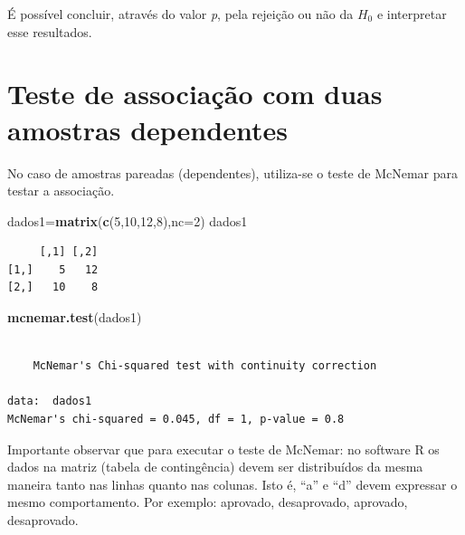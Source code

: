 \documentclass[12pt,brazil,oneside]{book}
\newenvironment{Shaded}{\begin{snugshade}}{\end{snugshade}}
\newcommand{\DataTypeTok}[1]{\textcolor[rgb]{0.13,0.29,0.53}{#1}}
\newcommand{\DecValTok}[1]{\textcolor[rgb]{0.00,0.00,0.81}{#1}}
\newcommand{\KeywordTok}[1]{\textcolor[rgb]{0.13,0.29,0.53}{\textbf{#1}}}
\newcommand{\NormalTok}[1]{#1}
\begin{document}
É possível concluir, através do valor \emph{p}, pela rejeição ou não da \(H_0\) e interpretar esse resultados.

\hypertarget{teste-de-associacao-com-duas-amostras-dependentes}{%
\section{Teste de associação com duas amostras dependentes}\label{teste-de-associacao-com-duas-amostras-dependentes}}

No caso de amostras pareadas (dependentes), utiliza-se o teste de McNemar para testar a associação.

\begin{Shaded}
\begin{Highlighting}[]
\NormalTok{dados1=}\KeywordTok{matrix}\NormalTok{(}\KeywordTok{c}\NormalTok{(}\DecValTok{5}\NormalTok{,}\DecValTok{10}\NormalTok{,}\DecValTok{12}\NormalTok{,}\DecValTok{8}\NormalTok{),}\DataTypeTok{nc=}\DecValTok{2}\NormalTok{)}
\NormalTok{dados1}
\end{Highlighting}
\end{Shaded}

\begin{verbatim}
     [,1] [,2]
[1,]    5   12
[2,]   10    8
\end{verbatim}

\begin{Shaded}
\begin{Highlighting}[]
\KeywordTok{mcnemar.test}\NormalTok{(dados1)}
\end{Highlighting}
\end{Shaded}

\begin{verbatim}

    McNemar's Chi-squared test with continuity correction

data:  dados1
McNemar's chi-squared = 0.045, df = 1, p-value = 0.8
\end{verbatim}

Importante observar que para executar o teste de McNemar: no software R os dados na matriz (tabela de contingência) devem ser distribuídos da mesma maneira tanto nas linhas quanto nas colunas. Isto é, ``a'' e ``d'' devem expressar o mesmo comportamento. Por exemplo: aprovado, desaprovado, aprovado, desaprovado.
\end{document}
